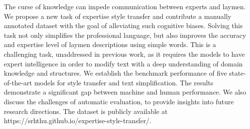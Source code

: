 The curse of knowledge can impede communication between experts and laymen. We propose a new task of expertise style transfer and contribute a manually annotated dataset with the goal of alleviating such cognitive biases. Solving this task not only simplifies the professional language, but also improves the accuracy and expertise level of laymen descriptions using simple words. This is a challenging task, unaddressed in previous work, as it requires the models to have expert intelligence in order to modify text with a deep understanding of domain knowledge and structures. We establish the benchmark performance of five state-of-the-art models for style transfer and text simplification. The results demonstrate a significant gap between machine and human performance. We also discuss the challenges of automatic evaluation, to provide insights into future research directions. The dataset is publicly available at https://srhthu.github.io/expertise-style-transfer/.

